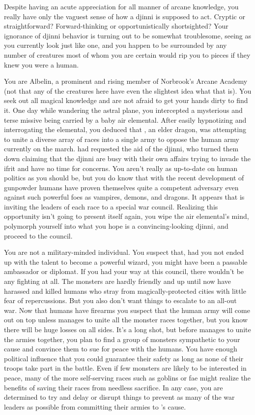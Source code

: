 \documentclass[char]{guildcamp2}
\begin{document}
\name{\cWizard{}}

Despite having an acute appreciation for all manner of arcane knowledge, you really have only the vaguest sense of how a djinni is supposed to act. Cryptic or straightforward? Forward-thinking or opportunistically shortsighted? Your ignorance of djinni behavior is turning out to be somewhat troublesome, seeing as you currently look just like one, and you happen to be surrounded by any number of creatures most of whom you are certain would rip you to pieces if they knew you were a human.

You are \cWizard{} Albelin, a prominent and rising member of Norbrook's Arcane Academy (not that any of the creatures here have even the slightest idea what that is). You seek out all magical knowledge and are not afraid to get your hands dirty to find it. One day while wandering the astral plane, you intercepted a mysterious and terse missive being carried by a baby air elemental. After easily hypnotizing and interrogating the elemental, you deduced that \cOnyx{}, an elder dragon, was attempting to unite a diverse array of races into a single army to oppose the human army currently on the march. \cOnyx{} had requested the aid of the djinni, who turned them down claiming that the djinni are busy with their own affairs trying to invade the ifrit and have no time for \cOnyx{\their} concerns. You aren't really as up-to-date on human politics as you should be, but you do know that with the recent development of gunpowder humans have proven themselves quite a competent adversary even against such powerful foes as vampires, demons, and dragons. It appears that \cOnyx{} is inviting the leaders of each race to a special war council. Realizing this opportunity isn't going to present itself again, you wipe the air elemental's mind, polymorph yourself into what you hope is a convincing-looking djinni, and proceed to the council.

You are not a military-minded individual. You suspect that, had you not ended up with the talent to become a powerful wizard, you might have been a passable ambassador or diplomat. If you had your way at this council, there wouldn't be any fighting at all. The monsters are hardly friendly and up until now have harassed and killed humans who stray from magically-protected cities with little fear of repercussions. But you also don't want things to escalate to an all-out war. Now that humans have firearms you suspect that the human army will come out on top unless \cOnyx{} manages to unite all the monster races together, but you know there will be huge losses on all sides. It's a long shot, but before \cOnyx{} manages to unite the armies together, you plan to find a group of monsters sympathetic to your cause and convince them to sue for peace with the humans. You have enough political influence that you could guarantee their safety as long as none of their troops take part in the battle. Even if few monsters are likely to be interested in peace, many of the more self-serving races such as goblins or fae might realize the benefits of saving their races from needless sacrifice. In any case, you are determined to try and delay or disrupt things to prevent as many of the war leaders as possible from committing their armies to \cOnyx{}'s cause.
\end{document}
